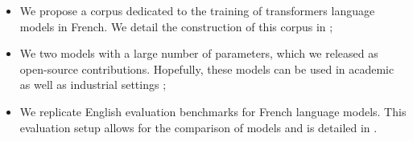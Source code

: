 \begin{itemize}
    \item We propose a corpus dedicated to the training of transformers language models in French. We detail the construction of this corpus in  ;
    \item We  two models with a large number of parameters, which we released as open-source contributions. Hopefully, these models can be used in academic as well as industrial settings ;
    \item We replicate English evaluation benchmarks for French language models. This evaluation setup allows for the comparison of models and is detailed in .
\end{itemize}




